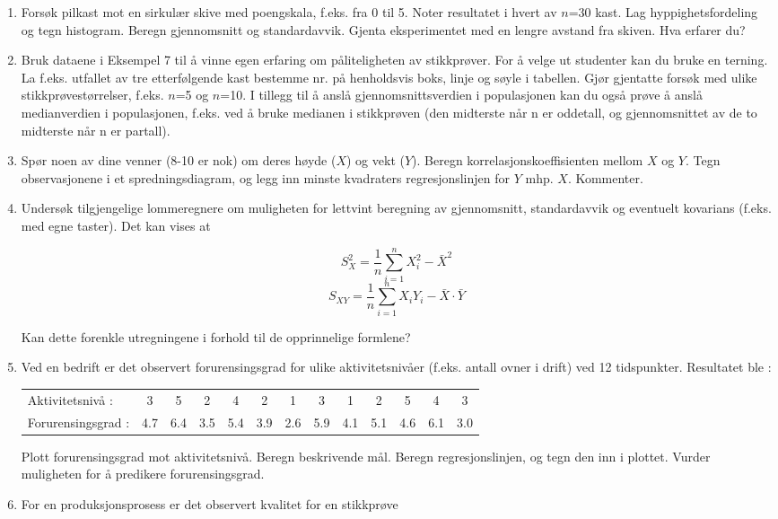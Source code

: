 \begin{enumerate}
\item
Forsøk pilkast mot en sirkulær skive med poengskala, f.eks. fra 0 til 5.
Noter resultatet i hvert av $n$=30 kast. Lag hyppighetsfordeling og
tegn histogram. Beregn gjennomsnitt og standardavvik. Gjenta
eksperimentet med en lengre avstand fra skiven. Hva erfarer du?
\item
Bruk dataene i Eksempel 7 til å vinne egen erfaring om påliteligheten
av stikkprøver. For å velge ut studenter kan du bruke en terning.
La f.eks. utfallet av tre etterfølgende kast bestemme nr. på
henholdsvis boks, linje og søyle i tabellen. Gjør gjentatte forsøk
med ulike stikkprøvestørrelser, f.eks. $n$=5 og $n$=10.
I tillegg til å anslå gjennomsnittsverdien i populasjonen kan du
også prøve å anslå medianverdien i populasjonen, f.eks. ved å bruke
medianen i stikkprøven (den midterste når n er oddetall, og 
gjennomsnittet av de to midterste når n er partall). 
\item
Spør noen av dine venner (8-10 er nok) om deres høyde ($X$) og
vekt ($Y$). Beregn korrelasjonskoeffisienten mellom $X$ og $Y$.
Tegn observasjonene i et spredningsdiagram, og legg inn minste
kvadraters regresjonslinjen for $Y$ mhp. $X$. Kommenter.
\item
Undersøk tilgjengelige lommeregnere om muligheten for lettvint
beregning av gjennomsnitt, standardavvik og eventuelt kovarians
(f.eks. med egne taster). Det kan vises at

\[S_{X}^{2}=\frac{1}{n}\sum_{i=1}^{n} X_{i}^{2}-\bar{X}^{2} \]
\[S_{XY}=\frac{1}{n}\sum_{i=1}^{n} X_{i}Y_{i}-\bar{X}\cdot\bar{Y} \]

Kan dette forenkle utregningene i forhold til de opprinnelige 
formlene?

\item
Ved en bedrift er det observert forurensingsgrad for ulike aktivitetsnivåer
(f.eks. antall ovner i drift) ved 12 tidspunkter. Resultatet ble :
\begin{center} \addtolength{\tabcolsep}{-0.5\tabcolsep}
\begin{tabular}{lcccccccccccc}
Aktivitetsnivå :&3&5&2&4&2&1&3&1&2&5&4&3 \\ 
Forurensingsgrad : &4.7&6.4&3.5&5.4&3.9&2.6&5.9&4.1&5.1&4.6&6.1&3.0
\end{tabular}
\end{center}
Plott forurensingsgrad mot aktivitetsnivå. Beregn beskrivende mål.
Beregn regresjonslinjen, og tegn den inn i plottet. Vurder muligheten for
å predikere forurensingsgrad.

\item
For en produksjonsprosess er det observert kvalitet for en stikkprøve


\end{enumerate}

